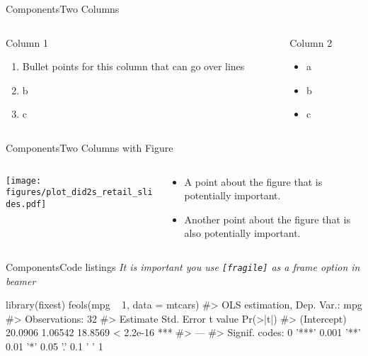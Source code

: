 \documentclass[aspectratio=169,t,11pt,table]{beamer}
\begin{document}
\begin{frame}{Components}{Two Columns}
  \begin{columns}[T]
    \begin{column}{.50\textwidth}
      \vspace{0pt}
      Column 1

      \begin{enumerate}
        \item Bullet points for this column that can go over lines
        \item b
        \item c
      \end{enumerate}
    \end{column}
    
    \hfill
    
    \begin{column}{.50\textwidth}
      Column 2

      \begin{itemize}
        \item a
        \item b
        \item c
      \end{itemize}
    \end{column}
  \end{columns}
\end{frame}

\begin{frame}{Components}{Two Columns with Figure}
  \begin{columns}[T]
    \begin{column}{.6\textwidth}
      \texttt{[image: figures/plot\_did2s\_retail\_slides.pdf]}
    \end{column}
    \hfill
    \begin{column}{.4\textwidth}
      \begin{itemize}
      \item A point about the figure that is potentially important.
      \item Another point about the figure that is also potentially important.
      \end{itemize}
    \end{column}
  \end{columns}
\end{frame}

\begin{frame}[fragile]{Components}{Code listings}
  \emph{It is important you use \texttt{[fragile]} as a frame option in beamer}

\begin{codeblock}
library(fixest)
feols(mpg ~ 1, data = mtcars)
#> OLS estimation, Dep. Var.: mpg
#> Observations: 32
#>             Estimate Std. Error t value  Pr(>|t|)    
#> (Intercept)  20.0906    1.06542 18.8569 < 2.2e-16 ***
#> ---
#> Signif. codes:  0 '***' 0.001 '**' 0.01 '*' 0.05 '.' 0.1 ' ' 1
\end{codeblock}
\end{frame}
\end{document}
